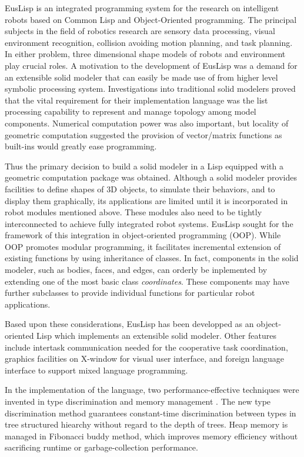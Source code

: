EusLisp is an integrated programming system 
for the research on intelligent robots
based on Common Lisp and Object-Oriented programming.
The principal subjects
in the field of robotics research are  sensory data processing,
visual environment recognition, collision avoiding motion planning,
and task planning.
In either problem, three dimensional shape models of robots and
environment play crucial roles.
A motivation to the development of EusLisp was a demand for an extensible
solid modeler that can easily be made use of from higher level symbolic
processing system.
Investigations into traditional solid modelers proved that the vital
requirement for their implementation language was the list processing
capability to represent and manage topology among model components.
Numerical computation power was also important, but locality of geometric
computation suggested the provision of vector/matrix functions as
built-ins would greatly ease programming.

Thus the primary decision to build a solid modeler in a Lisp
equipped with a geometric computation package was obtained.
Although a solid modeler provides facilities to define shapes of 3D
objects, to simulate their behaviors, and to display them graphically,
its applications are limited until it is incorporated in robot modules
mentioned above. These modules also need to be tightly interconnected
to achieve fully integrated robot systems.
EusLisp sought for the framework of this integration
in object-oriented programming (OOP).
While OOP promotes modular programming, it facilitates incremental
extension of existing functions by using inheritance of classes.
In fact, components in the solid modeler, such as bodies, faces, and edges,
can orderly be inplemented by extending one of the most basic class
{\em coordinates}.
These components may have further subclasses to provide individual functions
for particular robot applications.

Based upon these considerations, EusLisp has been developped as an
object-oriented Lisp which implements an extensible solid modeler\cite{Eus7}.
Other features include intertask communication needed for the cooperative
task coordination, graphics facilities on X-window for 
visual user interface, and foreign language interface to support
mixed language programming.

In the implementation of the language, two performance-effective techniques
were invented in type discrimination and memory management
\cite{Eus4,Eus5,Eus6}.
The new type discrimination method guarantees 
constant-time discrimination between
types in tree structured hiearchy without regard to the depth of trees.
Heap memory is managed in Fibonacci buddy method, which improves
memory efficiency without sacrificing runtime or garbage-collection
performance.


